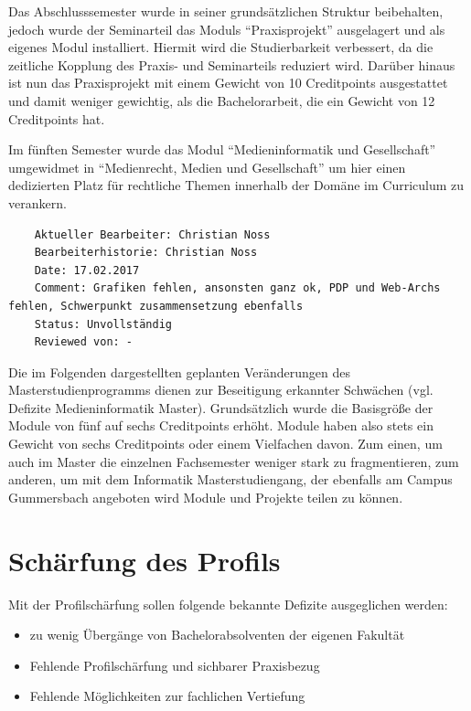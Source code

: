Das Abschlusssemester wurde in seiner grundsätzlichen Struktur
beibehalten, jedoch wurde der Seminarteil das Moduls ``Praxisprojekt''
ausgelagert und als eigenes Modul installiert. Hiermit wird die
Studierbarkeit verbessert, da die zeitliche Kopplung des Praxis- und
Seminarteils reduziert wird. Darüber hinaus ist nun das Praxisprojekt
mit einem Gewicht von 10 Creditpoints ausgestattet und damit weniger
gewichtig, als die Bachelorarbeit, die ein Gewicht von 12 Creditpoints
hat.

Im fünften Semester wurde das Modul ``Medieninformatik und
Gesellschaft'' umgewidmet in ``Medienrecht, Medien und Gesellschaft'' um
hier einen dedizierten Platz für rechtliche Themen innerhalb der Domäne
im Curriculum zu verankern.

\begin{verbatim}
    Aktueller Bearbeiter: Christian Noss
    Bearbeiterhistorie: Christian Noss
    Date: 17.02.2017
    Comment: Grafiken fehlen, ansonsten ganz ok, PDP und Web-Archs fehlen, Schwerpunkt zusammensetzung ebenfalls
    Status: Unvollständig
    Reviewed von: -
\end{verbatim}

Die im Folgenden dargestellten geplanten Veränderungen des
Masterstudienprogramms dienen zur Beseitigung erkannter Schwächen (vgl.
Defizite Medieninformatik Master). Grundsätzlich wurde die Basisgröße
der Module von fünf auf sechs Creditpoints erhöht. Module haben also
stets ein Gewicht von sechs Creditpoints oder einem Vielfachen davon.
Zum einen, um auch im Master die einzelnen Fachsemester weniger stark zu
fragmentieren, zum anderen, um mit dem Informatik Masterstudiengang, der
ebenfalls am Campus Gummersbach angeboten wird Module und Projekte
teilen zu können.

\section{Schärfung des Profils}\label{schuxe4rfung-des-profils}

Mit der Profilschärfung sollen folgende bekannte Defizite ausgeglichen
werden:

\begin{itemize}
\tightlist
\item
  zu wenig Übergänge von Bachelorabsolventen der eigenen Fakultät
\item
  Fehlende Profilschärfung und sichbarer Praxisbezug
\item
  Fehlende Möglichkeiten zur fachlichen Vertiefung
\end{itemize}

